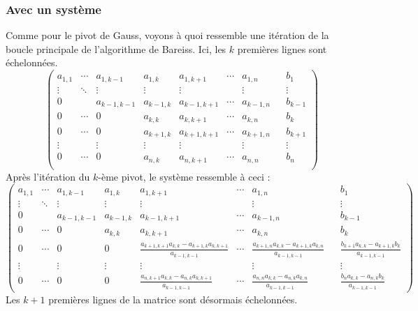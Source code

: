\documentclass[french]{article}
\begin{document}
\subsubsection{Avec un système}
Comme pour le pivot de Gauss, voyons à quoi ressemble une itération de la boucle principale de l'algorithme de Bareiss. Ici, les $k$ premières lignes sont échelonnées.
\begin{equation*}
	\begin{pmatrix}
		a_{1,1} & \cdots & a_{1,k-1} & a_{1,k} & a_{1,k+1} & \cdots & a_{1,n}&&b_1\\
		\vdots  & \ddots & \vdots & \vdots & \vdots & & \vdots&&\vdots\\
		0 & & a_{k-1,k-1} & a_{k-1,k} & a_{k-1,k+1} & \cdots & a_{k-1,n}&&b_{k-1}\\
		0 & \cdots & 0 & a_{k,k} & a_{k,k+1} & \cdots & a_{k,n}&&b_k\\
		0 & \cdots & 0 & a_{k+1,k} & a_{k+1,k+1} & \cdots & a_{k+1,n}&&b_{k+1}\\
		\vdots  & & \vdots & \vdots & \vdots & & \vdots&&\vdots\\
		0 & \cdots & 0 & a_{n,k} & a_{n,k+1} & \cdots & a_{n,n}&&b_n\\
	\end{pmatrix}
\end{equation*}
Après l'itération du $k$-ème pivot, le système ressemble à ceci :
\begin{equation*}
	\begin{pmatrix}
		a_{1,1} & \cdots & a_{1,k-1} & a_{1,k} & a_{1,k+1} & \cdots & a_{1,n}&&b_1\\
		\vdots  & \ddots & \vdots & \vdots & \vdots & & \vdots&&\vdots\\
		0 & & a_{k-1,k-1} & a_{k-1,k} & a_{k-1,k+1} & \cdots & a_{k-1,n}&&b_{k-1}\\
		0 & \cdots & 0 & a_{k,k} & a_{k,k+1} & \cdots & a_{k,n}&&b_k\\
		0 & \cdots & 0 & 0 & \frac{a_{k+1,k+1} a_{k,k} - a_{k+1,k} a_{k,k+1}}{a_{k-1,k-1}} & \cdots & \frac{a_{k+1,n} a_{k,k} - a_{k+1,k} a_{k,n}}{a_{k-1,k-1}}&&\frac{b_{k+1} a_{k,k} - a_{k+1,k} b_k}{a_{k-1,k-1}}\\
		\vdots  & & \vdots & \vdots & \vdots & & \vdots&&\vdots\\
		0 & \cdots & 0 & 0 & \frac{a_{n,k+1} a_{k,k} - a_{n,k} a_{k,k+1}}{a_{k-1,k-1}} & \cdots & \frac{a_{n,n} a_{k,k} - a_{n,k} a_{k,n}}{a_{k-1,k-1}}&&\frac{b_{n} a_{k,k} - a_{n,k} b_k}{a_{k-1,k-1}}
	\end{pmatrix}
\end{equation*}
Les $k+1$ premières lignes de la matrice sont désormais échelonnées.
\end{document}
